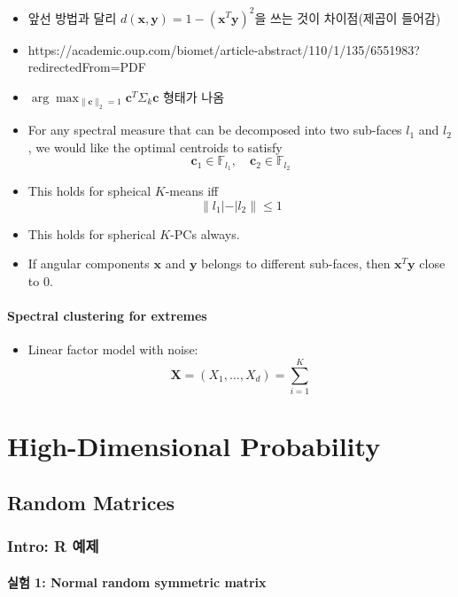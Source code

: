 \documentclass[
  letterpaper,
  DIV=11,
  numbers=noendperiod]{scrreprt}
\providecommand{\tightlist}{%
  \setlength{\itemsep}{0pt}\setlength{\parskip}{0pt}}
\theoremstyle{definition}
\theoremstyle{plain}
\theoremstyle{plain}
\theoremstyle{definition}
\theoremstyle{plain}
\theoremstyle{definition}
\theoremstyle{remark}
\begin{document}
\begin{itemize}
\item
  앞선 방법과 달리 \(d(\pmb{x}, \pmb{y}) = 1-(\pmb{x}^T\pmb{y})^2\)을
  쓰는 것이 차이점(제곱이 들어감)
\item
  https://academic.oup.com/biomet/article-abstract/110/1/135/6551983?redirectedFrom=PDF
\item
  \(\arg\max_{\|\pmb{c}\|_2=1} \pmb{c}^T\Sigma_k \pmb{c}\) 형태가 나옴
\item
  For any spectral measure that can be decomposed into two sub-faces
  \(l_1\) and \(l_2\), we would like the optimal centroids to satisfy \[
  \pmb{c}_1 \in \mathbb{F}_{l_1}, \quad{} \pmb{c}_2 \in \mathbb{F}_{l_2}
  \]
\item
  This holds for spheical \(K\)-means iff \[
  \|l_1 | - | l_2 \| \leq 1
  \]
\item
  This holds for spherical \(K\)-PCs always.
\item
  If angular components \(\pmb{x}\) and \(\pmb{y}\) belongs to different
  sub-faces, then \(\pmb{x}^T\pmb{y}\) close to \(0\).
\end{itemize}

\subsection{Spectral clustering for
extremes}\label{spectral-clustering-for-extremes}

\begin{itemize}
\tightlist
\item
  Linear factor model with noise: \[
  \pmb{X} = (X_1, \ldots, X_d) = \sum_{i=1}^K
  \]
\end{itemize}

\part{High-Dimensional Probability}

\chapter{Random Matrices}\label{random-matrices}

\section{Intro: R 예제}\label{intro-r-uxc608uxc81c}

\subsection{실험 1: Normal random symmetric
matrix}\label{uxc2e4uxd5d8-1-normal-random-symmetric-matrix}
\end{document}
